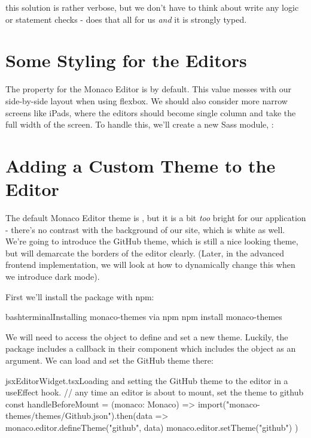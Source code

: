 \documentclass[paper=6in:9in,pagesize=pdftex,headinclude=on,footinclude=on,12pt,twoside]{scrbook}
\makeatletter
\newcommand{\at}{\makeatletter @\makeatother}
\makeatother
\begin{document}
this solution is rather verbose, but we don't have to think about write any  logic or  statement checks -  does that all for us \textit{and} it is strongly typed.

\section{Some Styling for the Editors}

The  property for the Monaco Editor is  by default. This value messes with our side-by-side layout when using flexbox. We should also consider more narrow screens like iPads, where the editors should become single column and take the full width of the screen. To handle this, we'll create a new Sass module, :


\section{Adding a Custom Theme to the Editor}

The default Monaco Editor theme is , but it is a bit \textit{too} bright for our application - there's no contrast with the background of our site, which is white as well. We're going to introduce the GitHub theme, which is still a nice looking theme, but will demarcate the borders of the editor clearly. (Later, in the advanced frontend implementation, we will look at how to dynamically change this when we introduce dark mode).

First we'll install the package  with npm:

\begin{codeInput}{bash}{terminal}{Installing monaco-themes via npm}
npm install monaco-themes
\end{codeInput}

We will need to access the  object to define and set a new theme. Luckily, the \codeword{\at monaco-editor/react} package includes a  callback in their component which includes the  object as an argument. We can load and set the GitHub theme there:


\begin{codeInput}{jsx}{EditorWidget.tsx}{Loading and setting the GitHub theme to the editor in a useEffect hook.}
// any time an editor is about to mount, set the theme to github
const handleBeforeMount = (monaco: Monaco) => {
  import("monaco-themes/themes/Github.json").then(data => {
    monaco.editor.defineTheme("github", data)
    monaco.editor.setTheme("github")
  })
}
\end{codeInput}
\end{document}
